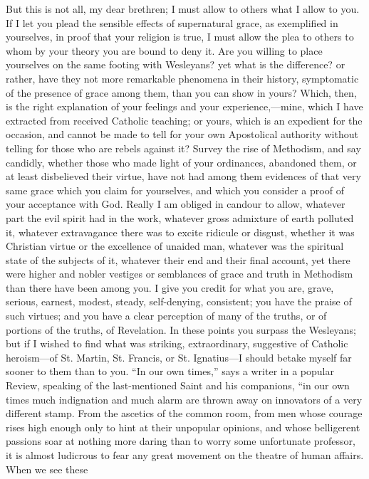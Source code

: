 But this is not all, my dear brethren; I must allow to others what
I allow to you. If I let you plead the sensible effects of
supernatural grace, as exemplified in yourselves, in proof that your
religion is true, I must allow the plea to others to whom by your
theory you are bound to deny it. Are you willing to place yourselves
on the same footing with Wesleyans? yet what is the difference? or
rather, have they not more remarkable phenomena in their history,
symptomatic of the presence of grace among them, than you can show in
yours? Which, then, is the right explanation of your feelings and your
experience,—mine, which I have extracted from received Catholic
teaching; or yours, which is an expedient for the occasion, and cannot
be made to tell for your own Apostolical authority without telling for
those who are rebels against it? Survey the rise of Methodism, and say
candidly, whether those who made light of your ordinances, abandoned
them, or at least disbelieved their virtue, have not had among them
evidences of that very same grace which you claim for yourselves, and
which you consider a proof of your acceptance with God. Really I am
obliged in candour to allow, whatever part the evil spirit had in the
work, whatever gross admixture of earth polluted it, whatever
extravagance there was to excite ridicule or disgust, whether it was
Christian virtue or the excellence of unaided man, whatever was the
spiritual state of the subjects of it, whatever their end and their
final account, yet there were higher and nobler vestiges or semblances
of grace and truth in Methodism than there have been among you. I give
you credit for what you are, grave, serious, earnest, modest, steady,
self-denying, consistent; you have the praise of such virtues; and you
have a clear perception of many of the truths, or of portions of the
truths, of Revelation. In these points you surpass the Wesleyans; but
if I wished to find what was striking, extraordinary, suggestive of
Catholic heroism—of St. Martin, St. Francis, or St. Ignatius—I
should betake myself far sooner to them than to you. ``In our own
times,'' says a writer in a popular Review, speaking of the
last-mentioned Saint and his companions, ``in our own times much
indignation and much alarm are thrown away on innovators of a very
different stamp. From the ascetics of the common room, from men whose
courage rises high enough only to hint at their unpopular opinions,
and whose belligerent passions soar at nothing more daring than to
worry some unfortunate professor, it is almost ludicrous to fear any
great movement on the theatre of human affairs. When we see these
